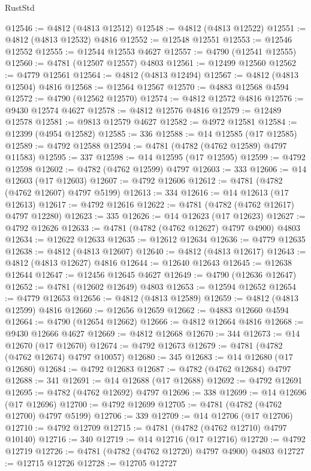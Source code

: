 \begin{lexlean}{RustStd}
\begin{coremodule}
@12546 := @4812 (@4813 @12512)
@12548 := @4812 (@4813 @12522)
@12551 := @4812 (@4813 @12532) @4816
@12552 := @12548 @12551
@12553 := @12546 @12552
@12555 := @12544 @12553 @4627
@12557 := @4790 (@12541 @12555)
@12560 := @4781 (@12507 @12557) @4803
@12561 := @12499 @12560
@12562 := @4779 @12561
@12564 := @4812 (@4813 @12494)
@12567 := @4812 (@4813 @12504) @4816
@12568 := @12564 @12567
@12570 := @4883 @12568 @4594
@12572 := @4790 (@12562 @12570)
@12574 := @4812 @12572 @4816
@12576 := @9430 @12574 @4627
@12578 := @4812 @12576 @4816
@12579 := @12489 @12578
@12581 := @9813 @12579 @4627
@12582 := @4972 @12581
@12584 := @12399 (@4954 @12582)
@12585 := 336
@12588 := @14 @12585 (@17 @12585)
@12589 := @4792 @12588
@12594 := @4781 (@4782 (@4762 @12589) @4797 @11583)
@12595 := 337
@12598 := @14 @12595 (@17 @12595)
@12599 := @4792 @12598
@12602 := @4782 (@4762 @12599) @4797
@12603 := 333
@12606 := @14 @12603 (@17 @12603)
@12607 := @4792 @12606
@12612 := @4781 (@4782 (@4762 @12607) @4797 @5199)
@12613 := 334
@12616 := @14 @12613 (@17 @12613)
@12617 := @4792 @12616
@12622 := @4781 (@4782 (@4762 @12617) @4797 @12280)
@12623 := 335
@12626 := @14 @12623 (@17 @12623)
@12627 := @4792 @12626
@12633 := @4781 (@4782 (@4762 @12627) @4797 @4900) @4803
@12634 := @12622 @12633
@12635 := @12612 @12634
@12636 := @4779 @12635
@12638 := @4812 (@4813 @12607)
@12640 := @4812 (@4813 @12617)
@12643 := @4812 (@4813 @12627) @4816
@12644 := @12640 @12643
@12645 := @12638 @12644
@12647 := @12456 @12645 @4627
@12649 := @4790 (@12636 @12647)
@12652 := @4781 (@12602 @12649) @4803
@12653 := @12594 @12652
@12654 := @4779 @12653
@12656 := @4812 (@4813 @12589)
@12659 := @4812 (@4813 @12599) @4816
@12660 := @12656 @12659
@12662 := @4883 @12660 @4594
@12664 := @4790 (@12654 @12662)
@12666 := @4812 @12664 @4816
@12668 := @9430 @12666 @4627
@12669 := @4812 @12668
@12670 := 344
@12673 := @14 @12670 (@17 @12670)
@12674 := @4792 @12673
@12679 := @4781 (@4782 (@4762 @12674) @4797 @10057)
@12680 := 345
@12683 := @14 @12680 (@17 @12680)
@12684 := @4792 @12683
@12687 := @4782 (@4762 @12684) @4797
@12688 := 341
@12691 := @14 @12688 (@17 @12688)
@12692 := @4792 @12691
@12695 := @4782 (@4762 @12692) @4797
@12696 := 338
@12699 := @14 @12696 (@17 @12696)
@12700 := @4792 @12699
@12705 := @4781 (@4782 (@4762 @12700) @4797 @5199)
@12706 := 339
@12709 := @14 @12706 (@17 @12706)
@12710 := @4792 @12709
@12715 := @4781 (@4782 (@4762 @12710) @4797 @10140)
@12716 := 340
@12719 := @14 @12716 (@17 @12716)
@12720 := @4792 @12719
@12726 := @4781 (@4782 (@4762 @12720) @4797 @4900) @4803
@12727 := @12715 @12726
@12728 := @12705 @12727

\end{coremodule}
\end{lexlean}
